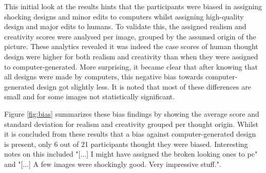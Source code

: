 This initial look at the results hints that the participants were biased in assigning shocking designs and minor edits to computers whilst assigning high-quality design and major edits to humans.
To validate this, the assigned realism and creativity scores were analysed per image, grouped by the assumed origin of the picture.
These analytics revealed it was indeed the case scores of human thought design were higher for both realism and creativity than when they were assigned to computer-generated.
More surprising, it became clear that after knowing that all designs were made by computers, this negative bias towards computer-generated design got slightly less. 
It is noted that most of these differences are small and for some images not statistically significant.

Figure \ref{fig:bias} summarizes these bias findings by showing the average score and standard deviation for realism and creativity grouped per thought origin.
Whilst it is concluded from these results that a bias against computer-generated design is present, only 6 out of 21 participants thought they were biased.
Interesting notes on this included "[...] I might have assigned the broken looking ones to pc" and "[...] A few images were shockingly good. Very impressive stuff.".

